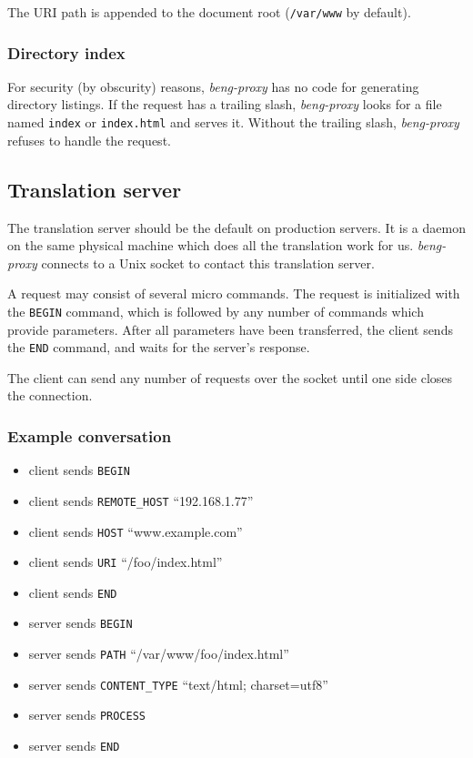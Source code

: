 \documentclass[a4paper,12pt]{article}
\begin{document}
The URI path is appended to the document root (\texttt{/var/www} by
default).

\subsubsection{Directory index}

For security (by obscurity) reasons, \emph{beng-proxy} has no code for
generating directory listings.  If the request has a trailing slash,
\emph{beng-proxy} looks for a file named \texttt{index} or
\texttt{index.html} and serves it.  Without the trailing slash,
\emph{beng-proxy} refuses to handle the request.


\subsection{Translation server}

The translation server should be the default on production servers.
It is a daemon on the same physical machine which does all the
translation work for us.  \emph{beng-proxy} connects to a Unix socket
to contact this translation server.

A request may consist of several micro commands.  The request is
initialized with the \texttt{BEGIN} command, which is followed by any
number of commands which provide parameters.  After all parameters
have been transferred, the client sends the \texttt{END} command,
and waits for the server's response.

The client can send any number of requests over the socket until one
side closes the connection.

\subsubsection{Example conversation}

\begin{itemize}
\item client sends \texttt{BEGIN}
\item client sends \texttt{REMOTE\_HOST} ``192.168.1.77''
\item client sends \texttt{HOST} ``www.example.com''
\item client sends \texttt{URI} ``/foo/index.html''
\item client sends \texttt{END}
\item server sends \texttt{BEGIN}
\item server sends \texttt{PATH} ``/var/www/foo/index.html''
\item server sends \texttt{CONTENT\_TYPE} ``text/html; charset=utf8''
\item server sends \texttt{PROCESS}
\item server sends \texttt{END}
\end{itemize}
\end{document}
